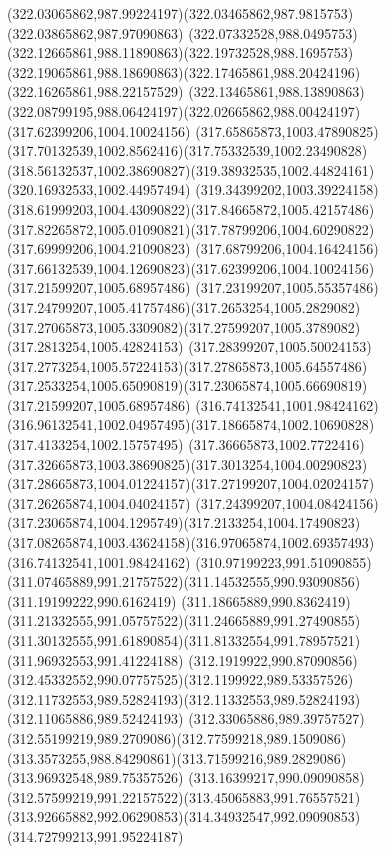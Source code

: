 {{	\curveto(322.03065862,987.99224197)(322.03465862,987.9815753)(322.03865862,987.97090863)
	\curveto(322.07332528,988.0495753)(322.12665861,988.11890863)(322.19732528,988.1695753)
	\curveto(322.19065861,988.18690863)(322.17465861,988.20424196)(322.16265861,988.22157529)
	\curveto(322.13465861,988.13890863)(322.08799195,988.06424197)(322.02665862,988.00424197)
	\moveto(317.62399206,1004.10024156)
	\curveto(317.65865873,1003.47890825)(317.70132539,1002.8562416)(317.75332539,1002.23490828)
	\curveto(318.56132537,1002.38690827)(319.38932535,1002.44824161)(320.16932533,1002.44957494)
	\curveto(319.34399202,1003.39224158)(318.61999203,1004.43090822)(317.84665872,1005.42157486)
	\curveto(317.82265872,1005.01090821)(317.78799206,1004.60290822)(317.69999206,1004.21090823)
	\curveto(317.68799206,1004.16424156)(317.66132539,1004.12690823)(317.62399206,1004.10024156)
	\moveto(317.21599207,1005.68957486)
	\curveto(317.23199207,1005.55357486)(317.24799207,1005.41757486)(317.2653254,1005.2829082)
	\curveto(317.27065873,1005.3309082)(317.27599207,1005.3789082)(317.2813254,1005.42824153)
	\curveto(317.28399207,1005.50024153)(317.2773254,1005.57224153)(317.27865873,1005.64557486)
	\curveto(317.2533254,1005.65090819)(317.23065874,1005.66690819)(317.21599207,1005.68957486)
	\moveto(316.74132541,1001.98424162)
	\curveto(316.96132541,1002.04957495)(317.18665874,1002.10690828)(317.4133254,1002.15757495)
	\curveto(317.36665873,1002.7722416)(317.32665873,1003.38690825)(317.3013254,1004.00290823)
	\curveto(317.28665873,1004.01224157)(317.27199207,1004.02024157)(317.26265874,1004.04024157)
	\curveto(317.24399207,1004.08424156)(317.23065874,1004.1295749)(317.2133254,1004.17490823)
	\curveto(317.08265874,1003.43624158)(316.97065874,1002.69357493)(316.74132541,1001.98424162)
	\moveto(310.97199223,991.51090855)
	\curveto(311.07465889,991.21757522)(311.14532555,990.93090856)(311.19199222,990.6162419)
	\curveto(311.18665889,990.8362419)(311.21332555,991.05757522)(311.24665889,991.27490855)
	\curveto(311.30132555,991.61890854)(311.81332554,991.78957521)(311.96932553,991.41224188)
	\curveto(312.1919922,990.87090856)(312.45332552,990.07757525)(312.1199922,989.53357526)
	\curveto(312.11732553,989.52824193)(312.11332553,989.52824193)(312.11065886,989.52424193)
	\curveto(312.33065886,989.39757527)(312.55199219,989.2709086)(312.77599218,989.1509086)
	\curveto(313.3573255,988.84290861)(313.71599216,989.2829086)(313.96932548,989.75357526)
	\curveto(313.16399217,990.09090858)(312.57599219,991.22157522)(313.45065883,991.76557521)
	\curveto(313.92665882,992.06290853)(314.34932547,992.09090853)(314.72799213,991.95224187)
}}
